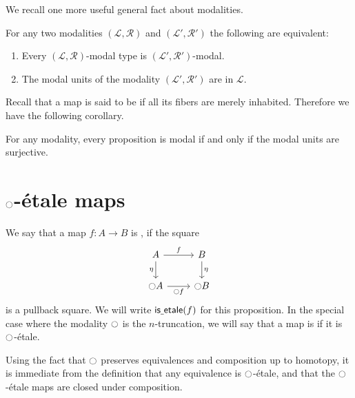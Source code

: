 \documentclass[9pt,twosided]{amsart}
\begin{document}
We recall one more useful general fact about modalities.

\begin{thm}
  For any two modalities $(\mathcal{L},\mathcal{R})$ and $(\mathcal{L}',\mathcal{R}')$ the following are equivalent:
\begin{enumerate}
\item Every $(\mathcal{L},\mathcal{R})$-modal type is $(\mathcal{L}',\mathcal{R}')$-modal.
\item The modal units of the modality $(\mathcal{L}',\mathcal{R}')$ are in $\mathcal{L}$.
\end{enumerate}
\end{thm}

Recall that a map is said to be  if all its fibers are merely inhabited. Therefore we have the following corollary.

\begin{cor}\label{cor:units-surjective}
  For any modality, every proposition is modal if and only if the modal units are surjective.
\end{cor}

\section{\texorpdfstring{${\ocircle}$}{○}-\'etale maps}

\begin{defn}
We say that a map $f:A\to B$ is , if the square
\begin{equation*}
\begin{tikzcd}
A \arrow[r,"f"] \arrow[d,swap,"\eta"] & B \arrow[d,"\eta"] \\
\modal A \arrow[r,swap,"\modal f"] & \modal B
\end{tikzcd}
\end{equation*}
is a pullback square. We will write $\mathsf{is\underline{\ }{}etale}(f)$ for this proposition. In the special case where the modality ${\ocircle}$ is the $n$-truncation, we will say that a map is  if it is ${\ocircle}$-\'etale.
\end{defn}

Using the fact that ${\ocircle}$ preserves equivalences and composition up to homotopy,
it is immediate from the definition that any equivalence is ${\ocircle}$-\'etale, and that the ${\ocircle}$-\'etale maps are closed under composition.
\end{document}
